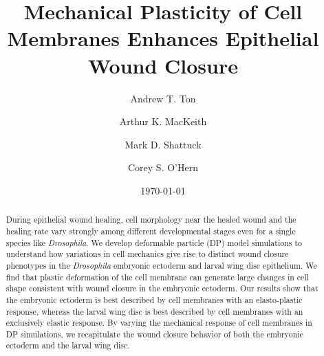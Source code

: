 \documentclass[%
 reprint,
superscriptaddress,
amsmath,amssymb,
prl,
floatfix,
]{revtex4-2}
\begin{document}

\title{Mechanical Plasticity of Cell Membranes Enhances Epithelial Wound Closure}

\author{Andrew T. Ton}
 
\author{Arthur K. MacKeith}
 
\author{Mark D. Shattuck}

\author{Corey S. O'Hern}

\date{\today}

\begin{abstract}
During epithelial wound healing, cell morphology near the healed wound and the healing rate vary strongly among different developmental stages even for a single species like \textit{Drosophila}. We develop deformable particle (DP) model simulations to understand how variations in cell mechanics give rise to distinct wound closure phenotypes in the \textit{Drosophila} embryonic ectoderm and larval wing disc epithelium.  We find that plastic deformation of the cell membrane can generate large changes in cell shape consistent with wound closure in the embryonic ectoderm. Our results show that the embryonic ectoderm is best described by cell membranes with an elasto-plastic response, whereas the larval wing disc is best described by cell membranes with an exclusively elastic response. By varying the mechanical response of cell membranes in DP simulations, we recapitulate the wound closure behavior of both the embryonic ectoderm and the larval wing disc.
\end{abstract}
\end{document}
